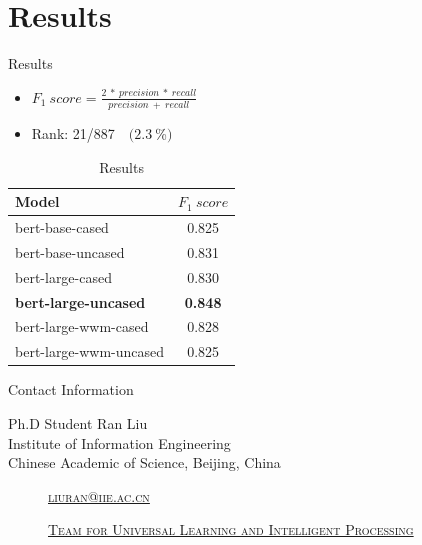 \documentclass[
 size=14pt,
 paper=smartboard,  %
 mode=present, 		%
 display=slides, 	%
 style=tuliplab,  	%
 pauseslide,
 fleqn,leqno]{powerdot}
\begin{document}
\section{Results}

\begin{slide}[toc=,bm=]{Results}
\begin{itemize}
	\item
	\bigskip \bigskip    
	\large
	{${F_1\ score}  = \frac{2\ *\ precision\ *\ recall}{precision\ +\ recall}$ }
	\item
	\large
	Rank: 21/887\ \ $( 2.3\ $\%$)$
\end{itemize}

\begin{table}[htbp]
	\setlength{\abovecaptionskip}{0pt}
	\setlength{\belowcaptionskip}{10pt}
	\centering
	\caption{Results}
	
	\begin{tabular}{lc}
		\hline
		Model                 & ${F_1\ score}$   \\
		\hline
		bert-base-cased   & 0.825    \\
		bert-base-uncased     & 0.831       \\
		bert-large-cased         & 0.830     \\
		\bf{bert-large-uncased}   & \bf{0.848}      \\
		bert-large-wwm-cased         & 0.828    \\
		bert-large-wwm-uncased        & 0.825      \\
		\hline
	\end{tabular}
\end{table}

\end{slide}

\begin{wideslide}[toc=,bm=]{Contact Information}
\centering
{}
\twocolumn[
lcolwidth=0.35\linewidth,
rcolwidth=0.65\linewidth
]
{
}
{
Ph.D Student Ran Liu\\
Institute of Information Engineering\\
Chinese Academic of Science, Beijing, China
\begin{description}
 \item[\textcolor{orange}{\faEnvelope}] \href{mailto:liuran@iie.ac.cn}
 {\textsc{\footnotesize{liuran@iie.ac.cn}}}

 \item[\textcolor{orange}{\faHome}] \href{http://www.tulip.org.au}
 {\textsc{\footnotesize{Team for Universal Learning and Intelligent Processing}}}
\end{description}
}
\end{wideslide}
\end{document}

